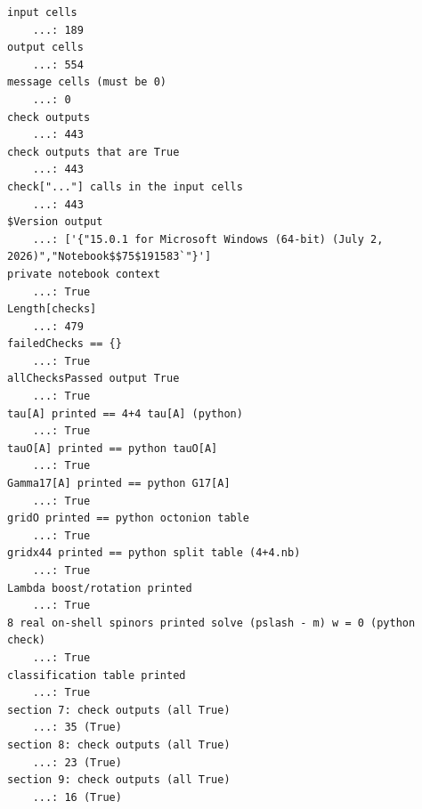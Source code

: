 \documentclass[10pt,a4paper]{article}
\begin{document}
\begin{Verbatim}[fontsize=\small,frame=single,framesep=2mm]
input cells                                                                                    
    ...: 189
output cells                                                                                   
    ...: 554
message cells (must be 0)                                                                      
    ...: 0
check outputs                                                                                  
    ...: 443
check outputs that are True                                                                    
    ...: 443
check["..."] calls in the input cells                                                          
    ...: 443
$Version output                                                                                
    ...: ['{"15.0.1 for Microsoft Windows (64-bit) (July 2, 2026)","Notebook$$75$191583`"}']
private notebook context                                                                       
    ...: True
Length[checks]                                                                                 
    ...: 479
failedChecks == {}                                                                             
    ...: True
allChecksPassed output True                                                                    
    ...: True
tau[A] printed == 4+4 tau[A] (python)                                                          
    ...: True
tauO[A] printed == python tauO[A]                                                              
    ...: True
Gamma17[A] printed == python G17[A]                                                            
    ...: True
gridO printed == python octonion table                                                         
    ...: True
gridx44 printed == python split table (4+4.nb)                                                 
    ...: True
Lambda boost/rotation printed                                                                  
    ...: True
8 real on-shell spinors printed solve (pslash - m) w = 0 (python check)                        
    ...: True
classification table printed                                                                   
    ...: True
section 7: check outputs (all True)                                                            
    ...: 35 (True)
section 8: check outputs (all True)                                                            
    ...: 23 (True)
section 9: check outputs (all True)                                                            
    ...: 16 (True)

\end{Verbatim}
\end{document}
